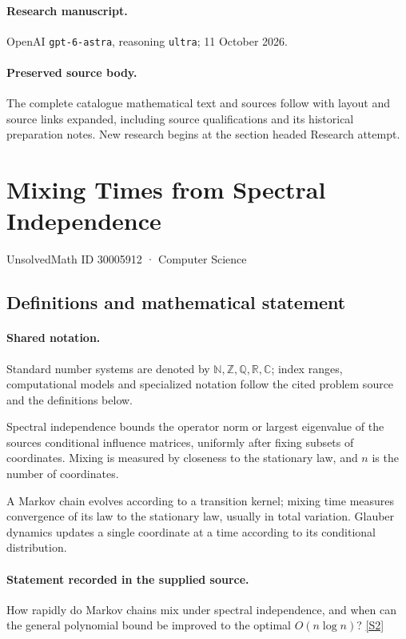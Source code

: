 \documentclass[11pt]{article}
\begin{document}
\paragraph{Research manuscript.} OpenAI \texttt{gpt-6-astra}, reasoning \texttt{ultra}; 11 October 2026.
\paragraph{Preserved source body.} The complete catalogue mathematical text and sources follow with layout and source links expanded, including source qualifications and its historical preparation notes. New research begins at the section headed Research attempt.

\section{Mixing Times from Spectral Independence}\label{30005912}
{\small UnsolvedMath ID 30005912 · Computer Science}
\subsection{Definitions and mathematical statement}

\paragraph{Shared notation.}Standard number systems are denoted by $\mathbb N,\mathbb Z,\mathbb Q,\mathbb R,\mathbb C$; index ranges, computational models and specialized notation follow the cited problem source and the definitions below.


Spectral independence bounds the operator norm or largest eigenvalue of the source\textquotesingle s conditional influence matrices, uniformly after fixing subsets of coordinates. Mixing is measured by closeness to the stationary law, and $n$ is the number of coordinates.

A Markov chain evolves according to a transition kernel; mixing time measures convergence of its law to the stationary law, usually in total variation. Glauber dynamics updates a single coordinate at a time according to its conditional distribution.
\paragraph{Statement recorded in the supplied source.}
How rapidly do Markov chains mix under spectral independence, and when can the general polynomial bound be improved to the optimal $O(n\log n)$? \href{https://doi.org/10.4171/owr/2024/27}{[S2]}
\end{document}
